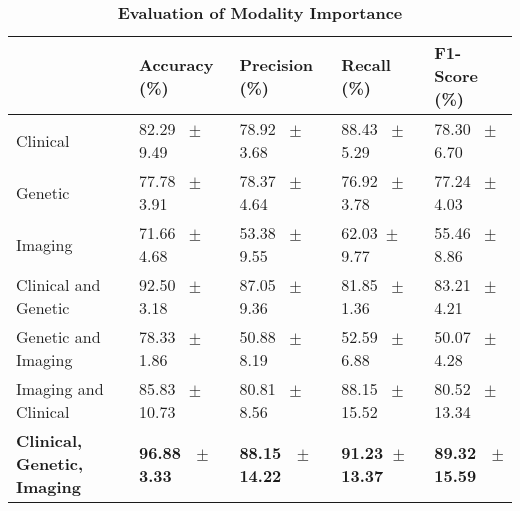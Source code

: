 \begin{table}[H]
\caption{\textbf{Evaluation of Modality Importance}}\label{tab:modal_imp}
\begin{tabular}{|l|l|l|l|l|}
\hline
                           & Accuracy (\%)     & Precision (\%)    & Recall (\%)       & F1-Score (\%)     \\ \hline
Clinical                   & 82.29\ { \scriptsize $\pm$ }  9.49\ & 78.92\ { \scriptsize $\pm$ } 3.68\  & 88.43\ { \scriptsize $\pm$ }  5.29\ & 78.30\ { \scriptsize $\pm$ }  6.70  \\ \hline
Genetic                    & 77.78\ { \scriptsize $\pm$ }  3.91\ & 78.37\ { \scriptsize $\pm$ }  4.64\ & 76.92\ { \scriptsize $\pm$ }  3.78\ & 77.24\ { \scriptsize $\pm$ }  4.03   \\ \hline
Imaging                    & 71.66\ { \scriptsize $\pm$ }  4.68   & 53.38\ { \scriptsize $\pm$ }  9.55\ & 62.03\ {\scriptsize $\pm$ }  9.77\ & 55.46\ { \scriptsize $\pm$ }  8.86\ \\ \hline
Clinical and Genetic       & 92.50\ { \scriptsize $\pm$ }  3.18\  & 87.05\ { \scriptsize $\pm$ }  9.36\ & 81.85\ { \scriptsize $\pm$ }  1.36\ & 83.21\ { \scriptsize $\pm$ }  4.21   \\ \hline
Genetic and Imaging        & 78.33\ { \scriptsize $\pm$ }  1.86\ & 50.88\ { \scriptsize $\pm$ }  8.19   & 52.59\ { \scriptsize $\pm$ }  6.88   & 50.07\ { \scriptsize $\pm$ }  4.28   \\ \hline
Imaging and Clinical       & 85.83\ { \scriptsize $\pm$ }  10.73  & 80.81\ { \scriptsize $\pm$ }  8.56   & 88.15\ { \scriptsize $\pm$ }  15.52  & 80.52\ { \scriptsize $\pm$ }  13.34  \\ \hline

\textbf{Clinical, Genetic, Imaging} & \textbf{96.88\ { \scriptsize $\pm$ }  3.33   }& \textbf{88.15\ { \scriptsize $\pm$ }  14.22}  & \textbf{91.23\ {\scriptsize $\pm$ }  13.37}  & \textbf{89.32\ { \scriptsize $\pm$ }  15.59 } \\ \hline
\end{tabular}
\end{table}